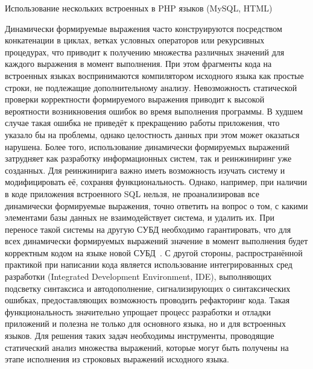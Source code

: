 \begin{listing}
\caption{Использование нескольких встроенных в PHP языков (MySQL, HTML)}
\label{lst:PhPSqlHtml}
\end{listing}



Динамически формируемые выражения часто конструируются посредством конкатенации в циклах, ветках условных операторов или рекурсивных процедурах, что приводит к получению множества различных значений для каждого выражения в момент выполнения. При этом фрагменты кода на встроенных  языках воспринимаются компилятором исходного языка как простые строки, не подлежащие дополнительному анализу. Невозможность статической проверки корректности формируемого выражения приводит к высокой вероятности возникновения ошибок во время выполнения программы. В худшем случае такая ошибка не приведёт к прекращению работы приложения, что указало бы на проблемы, однако целостность данных при этом может оказаться нарушена. Более того, использование динамически формируемых выражений затрудняет как разработку информационных систем, так и реинжиниринг уже созданных. Для реинжинирига важно иметь возможность изучать систему и модифицировать её, сохраняя функциональность. Однако, например, при наличии в коде приложения встроенного SQL нельзя, не проанализировав все динамически формируемые выражения, точно ответить на вопрос о том, с какими элементами базы данных не взаимодействует система, и удалить их. При переносе такой системы на другую СУБД необходимо гарантировать, что для всех динамически формируемых выражений значение в момент выполнения будет корректным кодом на языке новой СУБД~\cite{JSquash}. С другой стороны, распространённой практикой при написании кода является использование интегрированных сред разработки (Integrated Development Environment, IDE), выполняющих подсветку синтаксиса и автодополнение, сигнализирующих о синтаксических ошибках, предоставляющих возможность проводить рефакторинг кода. Такая функциональность значительно упрощает процесс разработки и отладки приложений и полезна не только для основного языка, но и для встроенных языков. Для решения таких задач необходимы инструменты, проводящие статический анализ множества выражений, которые могут быть получены на этапе исполнения из строковых выражений исходного языка.



